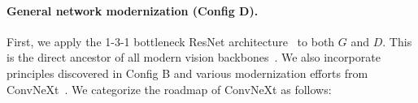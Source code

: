 \vspace{-0.3cm}
\paragraph{General network modernization (Config D).}
First, we apply the 1-3-1 bottleneck ResNet architecture~\cite{resnet,resnet2} to both $G$ and $D$. This is the direct ancestor of all modern vision backbones~\cite{convnext,metaformer}. 
We also incorporate principles discovered in Config B and various modernization efforts from ConvNeXt~\cite{convnext}. We categorize the roadmap of ConvNeXt as follows:

